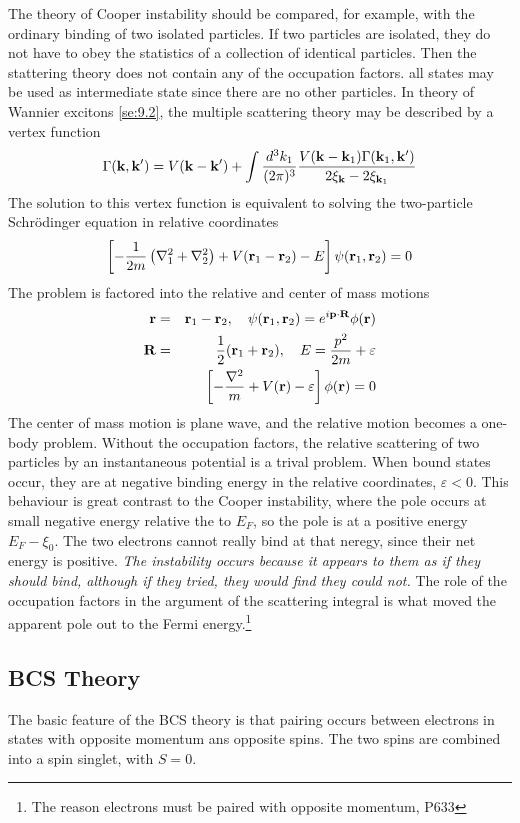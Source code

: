The theory of Cooper instability should be compared, for example, with the ordinary binding of two isolated particles.
If two particles are isolated, they do not have to obey the statistics of a collection of identical particles.
Then the stattering theory does not contain any of the occupation factors. all states may be used as intermediate state since there are no other particles.
In theory of Wannier excitons \ref{se:9.2}, the multiple scattering theory may be described by a vertex function
\begin{equation}
    \Gamma(\mathbf{k},\mathbf{k}') = V(\mathbf{k}-\mathbf{k}') + \int \frac{d^3 k_1}{(2\pi)^3} \frac{V(\mathbf{k}-\mathbf{k}_1) \Gamma(\mathbf{k}_1,\mathbf{k}')}{2\xi_{\mathbf{k}} - 2\xi_{\mathbf{k}_1}}  \label{10.16}
\end{equation}
The solution to this vertex function is equivalent to solving the two-particle Schr{\"o}dinger equation in relative coordinates
\begin{equation}
    \left[- \frac{1}{2m} \left(\nabla_1^2 + \nabla_2^2 \right) + V(\mathbf{r}_1 -\mathbf{r}_2) -E \right] \psi(\mathbf{r}_1,\mathbf{r}_2) = 0   \label{10.17}
\end{equation}
The problem is factored into the relative and center of mass motions
\begin{eqnarray}
    \mathbf{r} &=& \mathbf{r}_1 - \mathbf{r}_2, ~ ~ ~ \psi(\mathbf{r}_1,\mathbf{r}_2) = e^{i \mathbf{p} \cdot \mathbf{R}} \phi(\mathbf{r}) \label{10.18}\\
    \mathbf{R} &=& \frac{1}{2} (\mathbf{r}_1 + \mathbf{r}_2), ~ ~ ~ E= \frac{p^2}{2m} + \varepsilon   \label{10.19} \\
    &&\left[ - \frac{\nabla^2}{m} + V(\mathbf{r}) - \varepsilon \right] \phi(\mathbf{r}) = 0 \label{10.20}
\end{eqnarray}
The center of mass motion is plane wave, and the relative motion becomes a one-body problem.
Without the occupation factors, the relative scattering of two particles by an instantaneous potential is a trival problem.
When bound states occur, they are at negative binding energy in the relative coordinates, $\varepsilon<0$.
This behaviour is great contrast to the Cooper instability, where the pole occurs at small negative energy relative the to $E_F$, so the pole is at a positive energy $E_F-\xi_0$.
The two electrons cannot really bind at that neregy, since their net energy is positive.
\textit{The instability occurs because it appears to them as if they should bind, although if they tried, they would find they could not.}
The role of the occupation factors in the argument of the scattering integral is what moved the apparent pole out to the Fermi energy.\footnote{The reason electrons must be paired with opposite momentum, P633}

\subsection{BCS Theory}
The basic feature of the BCS theory is that pairing occurs between electrons in states with opposite momentum ans opposite spins.
The two spins are combined into a spin singlet, with $S=0$.
